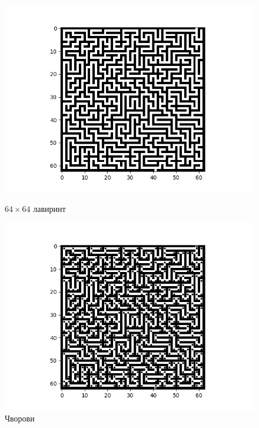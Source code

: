 \documentclass[11pt, oneside, a4paper]{article}
\begin{document}
\begin{figure}
    \begin{minipage}{0.5\textwidth}

        \includegraphics[scale=0.4, left]{baza.png}
        \caption{$64\times 64$ лавиринт}
        \label{fig:my_label}
    \end{minipage}
    \begin{minipage}{0.5\textwidth}
        \centering
        \includegraphics[scale=0.6, left]{tacke.png}
        \caption{Чворови}
        \label{fig:my_label}
    \end{minipage}
\end{figure}
\end{document}
